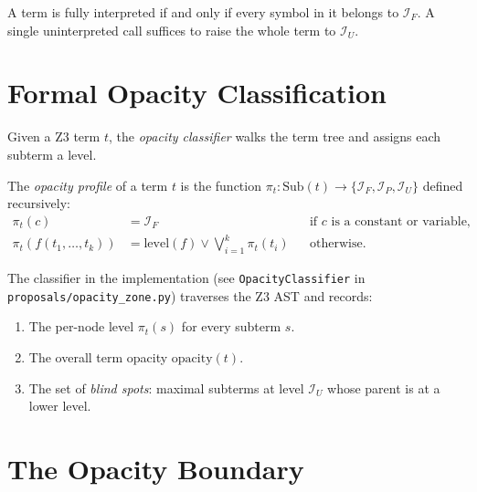 \begin{corollary}
A term is fully interpreted if and only if every symbol in it belongs
to $\mathcal{I}_F$.  A single uninterpreted call suffices to raise
the whole term to $\mathcal{I}_U$.
\end{corollary}


\section{Formal Opacity Classification}
\label{sec:opacity-classification}

Given a Z3 term $t$, the \emph{opacity classifier} walks the term
tree and assigns each subterm a level.

\begin{definition}
\label{def:opacity-profile}
The \emph{opacity profile} of a term $t$ is the function
$\pi_t : \mathrm{Sub}(t) \to \{\mathcal{I}_F, \mathcal{I}_P,
\mathcal{I}_U\}$ defined recursively:
\begin{align}
  \pi_t(c) &= \mathcal{I}_F
    && \text{if } c \text{ is a constant or variable,} \\
  \pi_t(f(t_1,\ldots,t_k)) &= \mathrm{level}(f)
    \vee \bigvee_{i=1}^{k} \pi_t(t_i)
    && \text{otherwise.}
\end{align}
\end{definition}

The classifier in the implementation (see \texttt{OpacityClassifier}
in \texttt{proposals/opacity\_zone.py}) traverses the Z3 AST and
records:
\begin{enumerate}
  \item The per-node level $\pi_t(s)$ for every subterm $s$.
  \item The overall term opacity $\mathrm{opacity}(t)$.
  \item The set of \emph{blind spots}: maximal subterms at level
    $\mathcal{I}_U$ whose parent is at a lower level.
\end{enumerate}


\section{The Opacity Boundary}
\label{sec:opacity-boundary}

